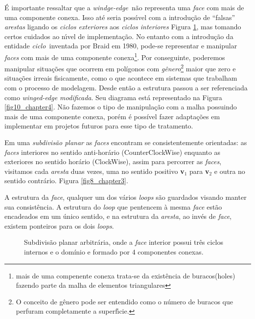 \documentclass[12pt,a4paper]{book}
\begin{document}
\'{E} importante ressaltar que a \textit{windge-edge}\textit{\ }n\~{a}o
representa uma \textit{face} com mais de uma componente conexa. Isso at\'{e}
seria poss\'{\i}vel com a introdu\c{c}\~{a}o de ``falsas'' \textit{arestas}
ligando os \textit{ciclos exteriores} aos \textit{ciclos interiores} Figura \ref{fig7_chapter3}, mas tomando certos cuidados ao n\'{\i}vel de implementa\c{c}\~{a}o. No entanto com a introdu\c{c}\~{a}o da entidade \textit{ciclo}\textit{\ }inventada por Braid\cite{braid} em 1980, pode-se representar e manipular \textit{faces} com mais de uma componente conexa\footnote{mais de uma compenente conexa trata-se da exist\^encia de buracos(holes) fazendo parte da malha de elementos triangulares}. Por conseguinte, poderemos manipular situa\c{c}\~{o}es que ocorrem em pol\'igonos com \textit{g\^{e}nero}\footnote{O conceito de g\^{e}nero pode ser entendido como o n\'{u}mero de buracos que perfuram completamente a superf\'{\i}cie.} maior que zero e situa\c{c}\~{o}es irreais fisicamente, como o que acontece em sistemas que trabalham com o processo de modelagem. Desde ent\~{a}o a estrutura passou a ser referenciada como \textit{winged-edge modificada}. Seu diagrama est\'a representado na Figura \ref{fig10_chapter4}. N\~ao fazemos o tipo de manipula\c{c}\~ao com a malha possuindo mais de uma componente conexa, por\'em \'e poss\'ivel fazer adapta\c{c}\~oes em implementar em projetos futuros para esse tipo de tratamento.

Em uma \textit{subdivis\~{a}o planar} as \textit{faces} encontram se
consistentemente orientadas: as \textit{faces} interiores no sentido anti-hor\'{a}rio (CounterClockWise) enquanto as exteriores no sentido hor\'{a}rio (ClockWise), assim para percorrer as \textit{faces}, visitamos cada \textit{aresta} duas vezes, uma no sentido positivo \textbf{v}$_{1}$ para \textbf{v}$_{2}$ e outra no sentido contr\'{a}rio. Figura \ref{fig8_chapter3}.

A estrutura da \textit{face}, qualquer um dos v\'{a}rios \textit{loops} s\~{a}o guardados visando manter sua consist\^{e}ncia. A estrutura do \textit{loop} que pentencem \`{a} mesma \textit{face} est\~{a}o encadeados em um \'{u}nico sentido, e na estrutura da \textit{aresta}, ao inv\'{e}s de \textit{face}, existem ponteiros para os dois \textit{loops}.

\begin{figure}[htbp]
  \begin{center}
    \leavevmode
    
    \caption{Subdivis\~{a}o planar arbitr\'{a}ria, onde a \emph{face} interior possui tr\^{e}s
	               ciclos internos e o dom\'inio e formado por 4 componentes conexas.}
    \label{fig7_chapter3}
  \end{center}
\end{figure}
\end{document}
